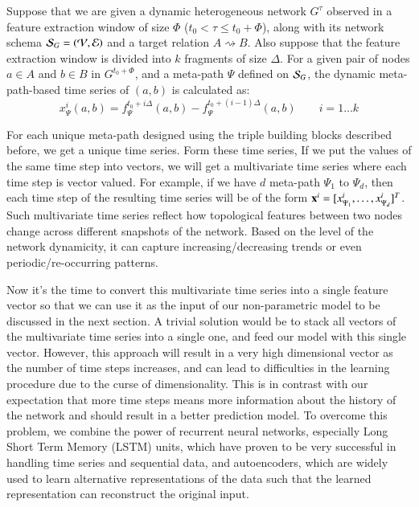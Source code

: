 \begin{definition}
	Suppose that we are given a dynamic heterogeneous network $G^{\tau}$ observed in a feature extraction window of size $\Phi$ ($t_0<\tau \le t_0+\Phi$), along with its network schema $\mathcal{S}_G=(\mathcal{V}, \mathcal{E})$ and a target relation $A\rightsquigarrow B$. Also suppose that the feature extraction window is divided into $k$ fragments of size $\Delta$. For a given pair of nodes $a\in A$ and $b\in B$ in $G^{t_0+\Phi}$, and a meta-path $\Psi$ defined on $\mathcal{S}_G$, the dynamic meta-path-based time series of $(a,b)$ is calculated as:
	\begin{equation}
		x_{\Psi}^i(a,b)=f_{\Psi}^{t_0+i\Delta}(a,b) - f_{\Psi}^{t_0+(i-1)\Delta}(a,b)\quad\quad i=1\dots k
	\end{equation}
\end{definition}

For each unique meta-path designed using the triple building blocks described before, we get a unique time series. Form these time series, If we put the values of the same time step into vectors, we will get a multivariate time series where each time step is vector valued. For example, if we have $d$ meta-path $\Psi_1$ to $\Psi_d$, then each time step of the resulting time series will be of the form $\mathbf{x}^i=[x_{\Psi_1}^i,\dots,x_{\Psi_d}^i]^T$. Such multivariate time series reflect how topological features between two nodes change across different snapshots of the network. Based on the level of the network dynamicity, it can capture increasing/decreasing trends or even periodic/re-occurring patterns.

Now it's the time to convert this multivariate time series into a single feature vector so that we can use it as the input of our non-parametric model to be discussed in the next section. A trivial solution would be to stack all vectors of the multivariate time series into a single one, and feed our model with this single vector. However, this approach will result in a very high dimensional vector as the number of time steps increases, and can lead to difficulties in the learning procedure due to the curse of dimensionality. This is in contrast with our expectation that more time steps means more information about the history of the network and should result in a better prediction model. To overcome this problem, we combine the power of recurrent neural networks, especially Long Short Term Memory (LSTM) units, which have proven to be very successful in handling time series and sequential data, and autoencoders, which are widely used to learn alternative representations of the data such that the learned representation can reconstruct the original input.

